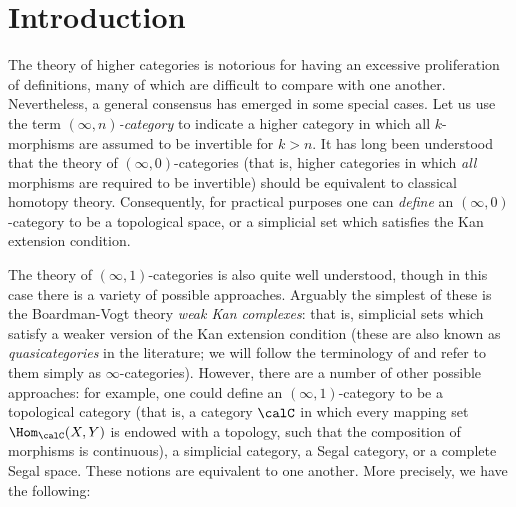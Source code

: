 \section*{Introduction}

The theory of higher categories is notorious for having an excessive proliferation of definitions,
many of which are difficult to compare with one another. Nevertheless, a general consensus has emerged in some special cases. Let us use the term {\it $(\infty,n)$-category} to indicate a higher category in which all $k$-morphisms are assumed to be invertible for $k > n$. It has long been understood that the theory of $(\infty,0)$-categories (that is, higher categories in which {\em all} morphisms are required to be invertible) should be equivalent to classical homotopy theory.
Consequently, for practical purposes one can {\em define} an $(\infty,0)$-category to be a topological
space, or a simplicial set which satisfies the Kan extension condition.

The theory of $(\infty,1)$-categories is also quite well understood, though in this case there
is a variety of possible approaches. Arguably the simplest of these is the Boardman-Vogt theory {\it weak Kan complexes}: that is, simplicial sets which satisfy a weaker version
of the Kan extension condition (these are also known as {\it quasicategories} in the literature;
we will follow the terminology of \cite{topoi} and refer to them simply as $\infty$-categories).
However, there are a number of other possible approaches: for example, one could define an $(\infty,1)$-category to be a topological
category (that is, a category $\calC$ in which every mapping set $\Hom_{\calC}(X,Y)$ is endowed
with a topology, such that the composition of morphisms is continuous), a simplicial category,
a Segal category, or a complete Segal space. These notions are equivalent to one another.
More precisely, we have the following:

